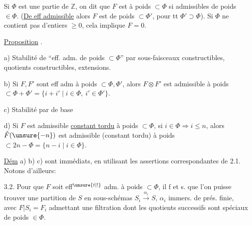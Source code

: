  Si $\Phi$ est une partie de $\mathbb Z$, on dit que $F$ est à poids $\subset\Phi$ si   admissibles de poids $\in\Phi$. (\uline{De eff admissible} alors $F$ est de poids $\subset\Phi'$, pour tt $\Phi'\supset\Phi$). Si   $\Phi$ ne contient pas d'entiers $\geq0$, cela implique $F=0$.



\uline{Proposition} .

a) Stabilité de ``eff. adm. de poids $\subset\Phi$'' par sous-faisceaux constructibles, quotients constructibles,  extensions.

b) Si $F,F'$ sont eff adm à poids $\subset\Phi,\Phi'$, alors $F\otimes F'$ est admissible à poids $\subset\Phi+\Phi'=\{i+i'\mid i\in\Phi,\ i'\in\Phi'\}$.

c) Stabilité par  de base

d) Si $F$ est  admissible \uline{constant tordu} à poids $\subset\Phi$,  si $i\in\Phi\Rightarrow i\leq n$, alors $\check F(\unsure{-n})$ est  admissible (constant tordu) à poids $\subset2n-\Phi=\{n-i\mid i\in\Phi\}$.


\uline{Dém} a) b) c) sont immédiats, en utilisant les assertions correspondantes de 2.1. Notons d'ailleurs:

3.2.  Pour que $F$ soit eff$^{\unsure{t|!}}$ adm. à poids $\subset\Phi$, il f et s. que l'on puisse trouver une partition de $S$ en  sous-schémas $S_i\xrightarrow{\alpha_i}S$, $\alpha_i$ immers. de prés. finie, avec  $F|S_i=F_i$ admettant une filtration dont les quotients successifs sont spéciaux de poids $\in\Phi$.


